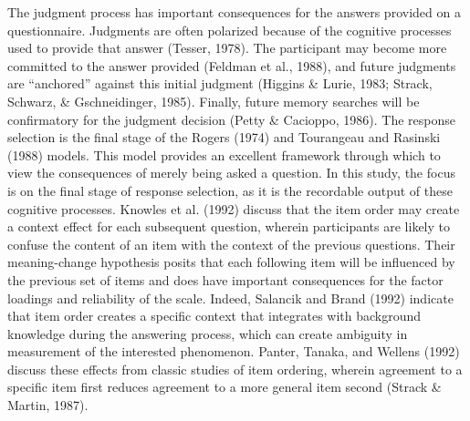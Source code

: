\documentclass[english,man, mask]{apa6}
\theoremstyle{definition}
\theoremstyle{definition}
\theoremstyle{definition}
\theoremstyle{remark}
\begin{document}
The judgment process has important consequences for the answers provided
on a questionnaire. Judgments are often polarized because of the
cognitive processes used to provide that answer (Tesser, 1978). The
participant may become more committed to the answer provided (Feldman et
al., 1988), and future judgments are \enquote{anchored} against this
initial judgment (Higgins \& Lurie, 1983; Strack, Schwarz, \&
Gschneidinger, 1985). Finally, future memory searches will be
confirmatory for the judgment decision (Petty \& Cacioppo, 1986). The
response selection is the final stage of the Rogers (1974) and
Tourangeau and Rasinski (1988) models. This model provides an excellent
framework through which to view the consequences of merely being asked a
question. In this study, the focus is on the final stage of response
selection, as it is the recordable output of these cognitive processes.
Knowles et al. (1992) discuss that the item order may create a context
effect for each subsequent question, wherein participants are likely to
confuse the content of an item with the context of the previous
questions. Their meaning-change hypothesis posits that each following
item will be influenced by the previous set of items and does have
important consequences for the factor loadings and reliability of the
scale. Indeed, Salancik and Brand (1992) indicate that item order
creates a specific context that integrates with background knowledge
during the answering process, which can create ambiguity in measurement
of the interested phenomenon. Panter, Tanaka, and Wellens (1992) discuss
these effects from classic studies of item ordering, wherein agreement
to a specific item first reduces agreement to a more general item second
(Strack \& Martin, 1987).
\end{document}
